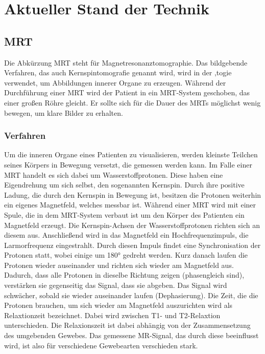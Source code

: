 
\chapter{Aktueller Stand der Technik}

\section{MRT}												 %

Die Abkürzung MRT steht für Magnetresonanztomographie. Das bildgebende Verfahren, das auch Kernspintomografie genannt wird, wird in der ,togie verwendet, um Abbildungen innerer Organe zu erzeugen. Während der Durchführung einer MRT wird der Patient in ein MRT-System geschoben, das einer großen Röhre gleicht. Er sollte sich für die Dauer des MRTs möglichst wenig bewegen, um klare Bilder zu erhalten.
 	
\subsection{Verfahren}

Um die inneren Organe eines Patienten zu visualisieren, werden kleinste Teilchen seines Körpers in Bewegung versetzt, die gemessen werden kann. Im Falle einer MRT handelt es sich dabei um Wasserstoffprotonen. Diese haben eine Eigendrehung um sich selbst, den sogenannten Kernspin. Durch ihre positive Ladung, die durch den Kernspin in Bewegung ist, besitzen die Protonen weiterhin ein eigenes Magnetfeld, welches messbar ist. 
Während einer MRT wird mit einer Spule, die in dem MRT-System verbaut ist um den Körper des Patienten ein Magnetfeld erzeugt. Die Kernspin-Achsen der Wasserstoffprotonen richten sich an diesem aus. Anschließend wird in das Magnetfeld ein Hochfrequenzimpuls, die Larmorfrequenz eingestrahlt. Durch diesen Impuls findet eine Synchronisation der Protonen statt, wobei einige um 180° gedreht werden. Kurz danach laufen die Protonen wieder auseinander und richten sich wieder am Magnetfeld aus. 
Dadurch, dass alle Protonen in dieselbe Richtung zeigen (phasengleich sind), verstärken sie gegenseitig das Signal, dass sie abgeben. Das Signal wird schwächer, sobald sie wieder auseinander laufen (Dephasierung).
Die Zeit, die die Protonen brauchen, um sich wieder am Magnetfeld auszurichten wird als Relaxtionzeit bezeichnet. Dabei wird zwischen T1- und T2-Relaxtion unterschieden.
Die Relaxionszeit ist dabei abhängig von der Zusammensetzung des umgebenden Gewebes. Das gemessene MR-Signal, das durch diese beeinflusst wird, ist also für verschiedene Gewebearten verschieden stark.

